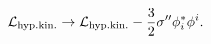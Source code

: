 \begin{equation}
  {\cal L}_{\rm hyp.kin.} \rightarrow 
  {\cal L}_{\rm hyp.kin.} - \frac32 \sigma'' \phi^*_i \phi^i.
\end{equation}

